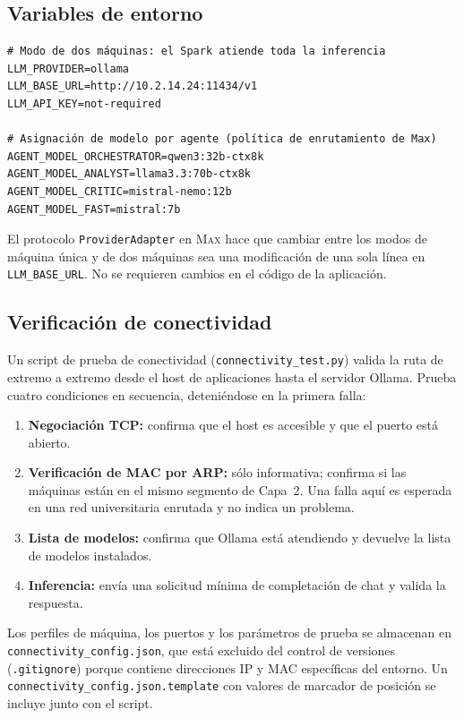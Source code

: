 \subsection{Variables de entorno}

\begin{lstlisting}[style=bashstyle, caption={.env para el modo de dos máquinas (host de aplicaciones Dell)}]
# Modo de dos máquinas: el Spark atiende toda la inferencia
LLM_PROVIDER=ollama
LLM_BASE_URL=http://10.2.14.24:11434/v1
LLM_API_KEY=not-required

# Asignación de modelo por agente (política de enrutamiento de Max)
AGENT_MODEL_ORCHESTRATOR=qwen3:32b-ctx8k
AGENT_MODEL_ANALYST=llama3.3:70b-ctx8k
AGENT_MODEL_CRITIC=mistral-nemo:12b
AGENT_MODEL_FAST=mistral:7b
\end{lstlisting}

El protocolo \texttt{ProviderAdapter} en \textsc{Max} hace que cambiar
entre los modos de máquina única y de dos máquinas sea una modificación
de una sola línea en \texttt{LLM\_BASE\_URL}. No se requieren cambios en
el código de la aplicación.

\subsection{Verificación de conectividad}

Un script de prueba de conectividad (\texttt{connectivity\_test.py})
valida la ruta de extremo a extremo desde el host de aplicaciones hasta el
servidor Ollama. Prueba cuatro condiciones en secuencia, deteniéndose en
la primera falla:

\begin{enumerate}
  \item \textbf{Negociación TCP:} confirma que el host es accesible y que
        el puerto está abierto.
  \item \textbf{Verificación de MAC por ARP:} sólo informativa; confirma
        si las máquinas están en el mismo segmento de Capa~2. Una falla
        aquí es esperada en una red universitaria enrutada y no indica
        un problema.
  \item \textbf{Lista de modelos:} confirma que Ollama está atendiendo y
        devuelve la lista de modelos instalados.
  \item \textbf{Inferencia:} envía una solicitud mínima de completación
        de chat y valida la respuesta.
\end{enumerate}

Los perfiles de máquina, los puertos y los parámetros de prueba se
almacenan en \texttt{connectivity\_config.json}, que está excluido del
control de versiones (\texttt{.gitignore}) porque contiene direcciones IP
y MAC específicas del entorno. Un \texttt{connectivity\_config.json.template}
con valores de marcador de posición se incluye junto con el script.

